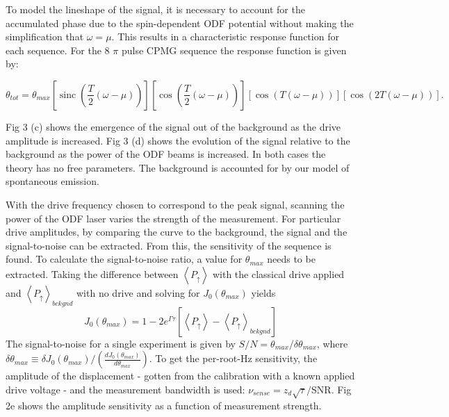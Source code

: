\documentclass[aps,prl,twocolumn,groupedaddress]{revtex4-1}
\DeclareMathOperator{\sinc}{sinc}
\begin{document}
To model the lineshape of the signal, it is necessary to account for the accumulated phase due to the spin-dependent ODF potential without making the simplification that $ \omega = \mu $. This results in a characteristic response function for each sequence. For the 8 $\pi$ pulse CPMG sequence the response function is given by:

\begin{widetext}
\begin{equation}
\theta_{tot} = \theta_{max} \left[ \sinc \left( \frac{T}{2} \left( \omega-\mu \right) \right) \right] 
\left[ \cos \left( \frac{T}{2} \left( \omega - \mu \right) \right) \right] \left[ \cos(T(\omega - \mu)) \right] \left[ \cos(2T(\omega - \mu)) \right] .
\end{equation}
\end{widetext}
Fig 3 (c) shows the emergence of the signal out of the background as the drive amplitude is increased. Fig 3 (d) shows the evolution of the signal relative to the background as the power of the ODF beams is increased. In both cases the theory has no free parameters. The background is accounted for by our model of spontaneous emission.

With the drive frequency chosen to correspond to the peak signal, scanning the power of the ODF laser varies the strength of the measurement. For particular drive amplitudes, by comparing the curve to the background, the signal and the signal-to-noise can be extracted. From this, the sensitivity of the sequence is found. To calculate the signal-to-noise ratio, a value for $\theta_{max}$ needs to be extracted. Taking the difference between $\left< P_{\uparrow} \right>$ with the classical drive applied and $\left< P_{\uparrow} \right>_{bckgnd}$ with no drive and solving for $J_0(\theta_{max})$ yields
\[J_0(\theta_{max}) = 1 - 2e^{\Gamma \tau} \left[ \left< P_{\uparrow} \right> - \left< P_{\uparrow} \right>_{bckgnd} \right] \]
The signal-to-noise for a single experiment is given by $S/N =\theta_{max}/\delta \theta_{max}$, where $\delta \theta_{max} \equiv \delta J_0(\theta_{max})/ \left( \frac{dJ_0(\theta_{max})}{d\theta_{max}} \right)$. To get the per-root-Hz sensitivity, the amplitude of the displacement - gotten from the calibration with a known applied drive voltage - and the measurement bandwidth is used: $\nu_{sense} = z_d\sqrt{\tau}/$SNR. Fig 2e shows the amplitude sensitivity as a function of measurement strength.
\end{document}
